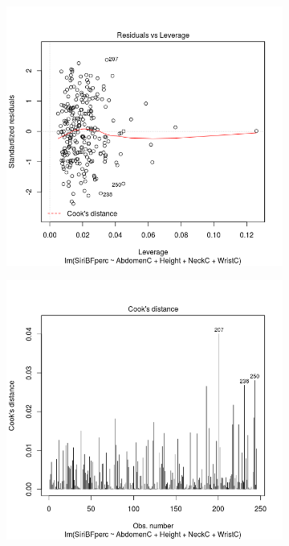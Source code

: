 \documentclass[a4paper, 11pt]{article}
\begin{document}
\begin{figure}[H]
\begin{subfigure}[t]{.5\textwidth}
  \end{subfigure}
  \begin{subfigure}[t]{.5\textwidth}
    \centering
    \includegraphics[width=\linewidth]{bwd_leverage.png}
  \end{subfigure}
  \hfill
  \begin{subfigure}[t]{.5\textwidth}
    \centering
    \includegraphics[width=\linewidth]{bwd_cooks.png}
  \end{subfigure}
\end{figure}
\end{document}

